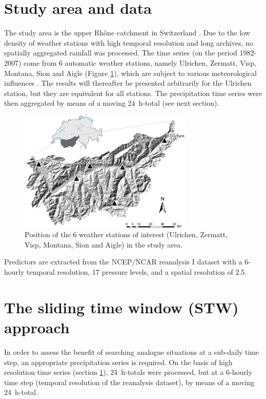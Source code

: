 \documentclass[hess]{copernicus}
\begin{document}
\section{Study area and data}
\label{sec:data}

The study area is the upper Rh\^{o}ne catchment in Switzerland \cite[see also][]{Horton2012a}. Due to the low density of weather stations with high temporal resolution and long archives, no spatially aggregated rainfall was processed. The time series (on the period 1982-2007) come from 6 automatic weather stations, namely Ulrichen, Zermatt, Visp, Montana, Sion and Aigle (Figure \ref{fig:map}), which are subject to various meteorological influences \citep{Horton2012}. The results will thereafter be presented arbitrarily for the Ulrichen station, but they are equivalent for all stations. The precipitation time series were then aggregated by means of a moving 24~h-total (see next section).


\begin{figure}[htb]
	\begin{center}
		\includegraphics[width=8.3cm]{figures/figure_map.pdf}
	\end{center}
	\caption{Position of the 6 weather stations of interest (Ulrichen, Zermatt, Visp, Montana, Sion and Aigle) in the study area.}
	\label{fig:map}
\end{figure}

Predictors are extracted from the NCEP/NCAR reanalysis I \citep{Kalnay1996} dataset with a 6-hourly temporal resolution, 17 pressure levels, and a spatial resolution of 2.5\degree.


\section{The sliding time window (STW) approach}
\label{sec:method}

In order to assess the benefit of searching analogue situations at a sub-daily time step, an appropriate precipitation series is required. On the basis of high resolution time series (section \ref{sec:data}), 24~h-totals were processed, but at a 6-hourly time step (temporal resolution of the reanalysis dataset), by means of a moving 24~h-total. 
\end{document}
